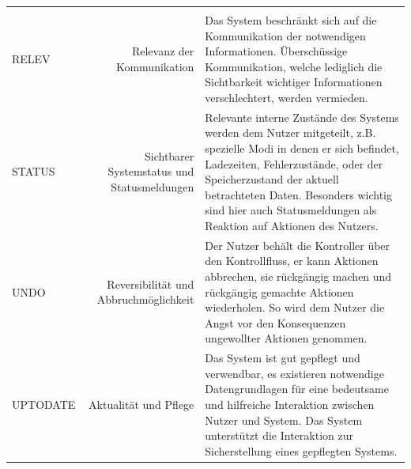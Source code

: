 \documentclass[
  12pt,
  ngerman,
  a4paper,
]{article}
\begin{document}
\begin{longtable}[]{@{}lrl@{}}
\begin{minipage}[t]{0.58\columnwidth}
\end{minipage}\tabularnewline
\begin{minipage}[t]{0.09\columnwidth}\raggedright
RELEV\strut
\end{minipage} & \begin{minipage}[t]{0.25\columnwidth}\raggedleft
Relevanz der Kommunikation\strut
\end{minipage} & \begin{minipage}[t]{0.58\columnwidth}\raggedright
Das System beschränkt sich auf die Kommunikation der notwendigen
Informationen. Überschüssige Kommunikation, welche lediglich die
Sichtbarkeit wichtiger Informationen verschlechtert, werden
vermieden.\strut
\end{minipage}\tabularnewline
\begin{minipage}[t]{0.09\columnwidth}\raggedright
STATUS\strut
\end{minipage} & \begin{minipage}[t]{0.25\columnwidth}\raggedleft
Sichtbarer Systemstatus und Statusmeldungen\strut
\end{minipage} & \begin{minipage}[t]{0.58\columnwidth}\raggedright
Relevante interne Zustände des Systems werden dem Nutzer mitgeteilt,
z.B. spezielle Modi in denen er sich befindet, Ladezeiten,
Fehlerzustände, oder der Speicherzustand der aktuell betrachteten Daten.
Besonders wichtig sind hier auch Statusmeldungen als Reaktion auf
Aktionen des Nutzers.\strut
\end{minipage}\tabularnewline
\begin{minipage}[t]{0.09\columnwidth}\raggedright
UNDO\strut
\end{minipage} & \begin{minipage}[t]{0.25\columnwidth}\raggedleft
Reversibilität und Abbruchmöglichkeit\strut
\end{minipage} & \begin{minipage}[t]{0.58\columnwidth}\raggedright
Der Nutzer behält die Kontroller über den Kontrollfluss, er kann
Aktionen abbrechen, sie rückgängig machen und rückgängig gemachte
Aktionen wiederholen. So wird dem Nutzer die Angst vor den Konsequenzen
ungewollter Aktionen genommen.\strut
\end{minipage}\tabularnewline
\begin{minipage}[t]{0.09\columnwidth}\raggedright
UPTODATE\strut
\end{minipage} & \begin{minipage}[t]{0.25\columnwidth}\raggedleft
Aktualität und Pflege\strut
\end{minipage} & \begin{minipage}[t]{0.58\columnwidth}\raggedright
Das System ist gut gepflegt und verwendbar, es existieren notwendige
Datengrundlagen für eine bedeutsame und hilfreiche Interaktion zwischen
Nutzer und System. Das System unterstützt die Interaktion zur
Sicherstellung eines gepflegten Systems.\strut
\end{minipage}\tabularnewline
\bottomrule
\end{longtable}
\end{document}
